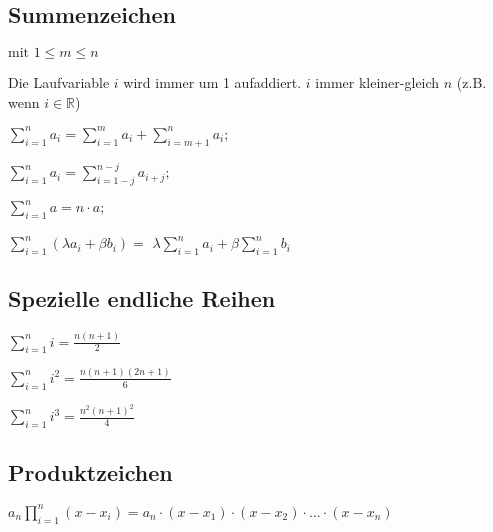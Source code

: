 \subsection{Summenzeichen}
	\begin{minipage}[c]{4.75cm}
		$\text{mit 1}\leq m\leq n $
	\end{minipage}
	\begin{minipage}[c]{16cm}
			Die Laufvariable $i$ wird immer um 1 aufaddiert. $i$ immer kleiner-gleich $n$ (z.B. wenn $i \in \mathbb{R}$)
	\end{minipage}
	\begin{minipage}[c]{4.75cm}
		$\sum\limits _{i=1}^n a_i = \sum\limits _{i=1}^m a_i + \sum\limits _{i=m+1}^n a_i;$
	\end{minipage}
	\begin{minipage}[c]{4.25cm}	
		$\sum\limits _{i=1}^n a_i = \sum\limits _{i=1-j}^{n-j} a_{i+j};$
	\end{minipage}
	\begin{minipage}[c]{4.25cm}
		$\sum\limits _{i=1}^n a = n\cdot a;$
	\end{minipage}
	\begin{minipage}[c]{8cm}
		$\sum\limits _{i=1}^n \left(\lambda a_i + \beta b_i \right) = $
		$\lambda \sum\limits _{i=1}^n a_i + \beta \sum\limits _{i=1}^n b_i$	
	\end{minipage}
	
\subsection{Spezielle endliche Reihen}
			\begin{minipage}[c]{4.25cm}
				$\sum\limits _{i=1}^n i = \frac{n(n+1)}{2}$
			\end{minipage}
			\begin{minipage}[c]{4.25cm}	
				$\sum\limits _{i=1}^n i^2 = \frac{n(n+1)(2n+1)}{6}$
			\end{minipage}
			\begin{minipage}[c]{4.25cm}
				$\sum\limits _{i=1}^n i^3 = \frac{n^2(n+1)^2}{4}$
			\end{minipage}

\subsection{Produktzeichen}
	$a_n\prod\limits _{i=1}^n \left(x-x_i\right)=
	a_n\cdot\left(x-x_1\right)\cdot\left(x-x_2\right)\cdot...\cdot\left(x-x_n\right)$
	
